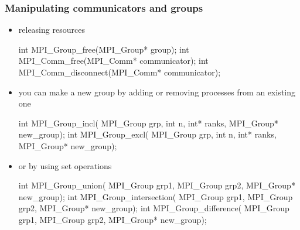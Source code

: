 \begin{frame}[fragile]
%
  \frametitle{Manipulating communicators and groups}
%
  \begin{itemize}
%
  \item releasing resources
    \begin{C}
int MPI_Group_free(MPI_Group* group);
int MPI_Comm_free(MPI_Comm* communicator);
int MPI_Comm_disconnect(MPI_Comm* communicator);
    \end{C}
%
  \item you can make a new group by adding or removing processes from an existing one
    \begin{C}
int MPI_Group_incl(
    MPI_Group grp, int n, int* ranks, MPI_Group* new_group);
int MPI_Group_excl(
    MPI_Group grp, int n, int* ranks, MPI_Group* new_group);
    \end{C}
%
  \item or by using set operations
    \begin{C}
int MPI_Group_union(
    MPI_Group grp1, MPI_Group grp2, MPI_Group* new_group);
int MPI_Group_intersection(
    MPI_Group grp1, MPI_Group grp2, MPI_Group* new_group);
int MPI_Group_difference(
    MPI_Group grp1, MPI_Group grp2, MPI_Group* new_group);
    \end{C}
%
  \end{itemize}
%
\end{frame}

